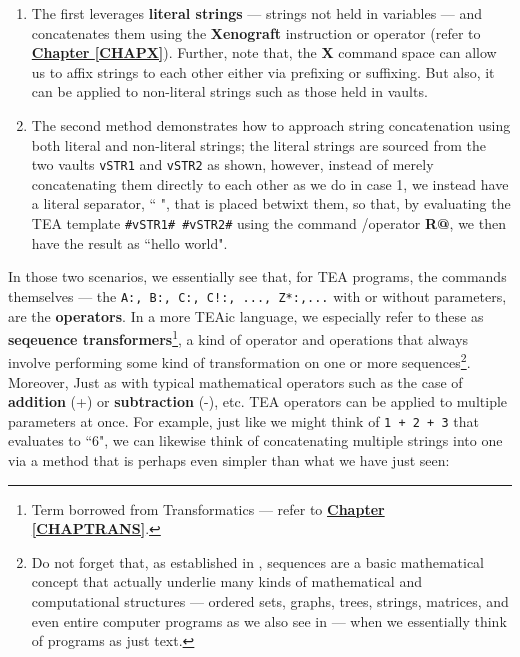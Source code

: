 \documentclass[a4paper, 18pt]{book} %
\begin{document}
{{{\begin{appendices}
\begin{enumerate}
\item The first leverages \textbf{literal strings} --- strings not held in variables --- and concatenates them using the \textbf{Xenograft} instruction or operator (refer to \textbf{\hyperref[CHAPX]{Chapter \ref{CHAPX}}}). Further, note that, the \textbf{X} command space can allow us to affix strings to each other either via prefixing or suffixing. But also, it can be applied to non-literal strings such as those held in vaults.
\item The second method demonstrates how to approach string concatenation using both literal and non-literal strings; the literal strings are sourced from the two vaults \texttt{vSTR1} and \texttt{vSTR2} as shown, however, instead of merely concatenating them directly to each other as we do in case 1, we instead have a literal separator, `` ", that is placed betwixt them, so that, by evaluating the TEA template \texttt{{\#vSTR1\# \#vSTR2\#}} using the command /operator \textbf{R@}, we then have the result as ``hello world".
\end{enumerate}


\vspace{2em}

In those two scenarios, we essentially see that, for TEA programs, the commands themselves --- the \texttt{A:, B:, C:, C!:, ..., Z*:,...} with or without parameters, are the \textbf{operators}. In a more TEAic language, we especially refer to these as \textbf{seqeuence transformers}\footnote{Term borrowed from Transformatics --- refer to \textbf{\hyperref[CHAPTRANS]{Chapter \ref{CHAPTRANS}}}.}, a kind of operator and operations that always involve performing some kind of transformation on one or more sequences\footnote{Do not forget that, as established in \cite{lutalo_2026_19995017}, sequences are a basic mathematical concept that actually underlie many kinds of mathematical and computational structures --- ordered sets, graphs, trees, strings, matrices, and even entire computer programs as we also see in \cite{lutalo2024software} --- when we essentially think of programs as just text.}. Moreover, Just as with typical mathematical operators such as the case of \textbf{addition} (+) or \textbf{subtraction} (-), etc. TEA operators can be applied to multiple parameters at once. For example, just like we might think of \texttt{1 + 2 + 3} that evaluates to ``6", we can likewise think of concatenating multiple strings into one via a method that is perhaps even simpler than what we have just seen:




\end{appendices}}}}
\end{document}
